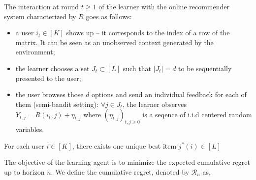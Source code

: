 

The interaction at round $t\geq 1$ of the learner with the online recommender system characterized by $R$
goes as follows:
\begin{itemize}
	\item a user $i_t\in [K]$ shows up -- it corresponds to the index of a row of the matrix. It can be seen as an unobserved context generated by the environment;
	\item the learner chooses a set $J_t\subset [L]$ such that $|J_t|=d$ to be sequentially presented to the user;
	\item the user browses those $d$ options and send an individual feedback for each of them (semi-bandit setting): $\forall j\in J_t$, the learner observes $Y_{t,j}= R(i_t,j) + \eta_{t,j}$ where $(\eta_{t,j})_{t,j\geq 0}$ is a seqence of i.i.d centered random variables. 
\end{itemize}

For each user $i\in [K]$, there exists one unique best item $j^*(i)\in [L]$

The objective of the learning agent is to minimize the expected cumulative regret up to horizon $n$. We define the cumulative regret, denoted by $\mathcal{R}_n$ as,

\begin{align*}
\end{align*}


